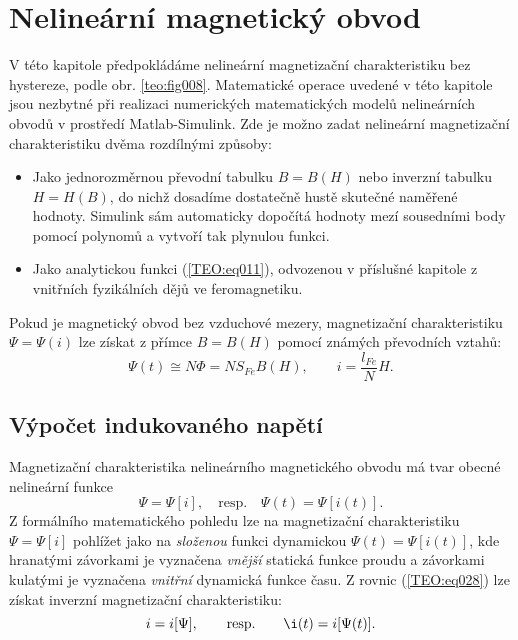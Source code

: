 {  \section{Nelineární magnetický obvod}
    V této kapitole předpokládáme nelineární magnetizační charakteristiku bez hystereze, podle obr. 
    \ref{teo:fig008}. Matematické operace uvedené v této kapitole jsou nezbytné při realizaci 
    numerických matematických modelů nelineárních obvodů v prostředí Matlab-Simulink. Zde je možno 
    zadat nelineární magnetizační charakteristiku dvěma rozdílnými způsoby:
    \begin{itemize}
      \item Jako jednorozměrnou převodní tabulku \(B = B(H)\) nebo inverzní tabulku \(H = H(B)\),
            do nichž dosadíme dostatečně hustě skutečné naměřené hodnoty. Simulink sám automaticky
            dopočítá hodnoty mezí sousedními body pomocí polynomů a vytvoří tak plynulou funkci.
      \item Jako analytickou funkci (\ref{TEO:eq011}), odvozenou v příslušné kapitole z vnitřních
            fyzikálních dějů ve feromagnetiku.
    \end{itemize}
    Pokud je magnetický obvod bez vzduchové mezery, magnetizační charakteristiku \(\Psi = \Psi(i)\) 
    lze získat z přímce \(B = B(H)\) pomocí známých převodních vztahů:
    \begin{equation}  \label{TEO:eq012}
      \Psi(t) \cong N\Phi = NS_{Fe}B(H), \qquad i = \dfrac{l_{Fe}}{N}H.
    \end{equation}
    
    \subsection{Výpočet indukovaného napětí}
      Magnetizační charakteristika nelineárního magnetického obvodu má tvar obecné nelineární 
      funkce 
      \begin{equation}\label{TEO:eq028}
        \Psi    = \Psi[i], \quad\text{resp.}\quad
        \Psi(t) = \Psi[i(t)].
      \end{equation}
      Z formálního matematického pohledu lze na magnetizační charakteristiku \(\Psi = \Psi[i]\) 
      pohlížet jako na \emph{složenou} funkci dynamickou \(\Psi(t) = \Psi[i(t)]\), kde hranatými 
      závorkami je vyznačena \emph{vnější} statická funkce proudu a závorkami kulatými je vyznačena 
      \emph{vnitřní} dynamická funkce času. Z rovnic (\ref{TEO:eq028}) lze získat inverzní 
      magnetizační charakteristiku:
      \begin{equation}\label{TEO:eq029}
        i = i[\Psi], \qquad\text{resp.}\qquad \i(t) = i[\Psi(t)].
      \end{equation}

}

